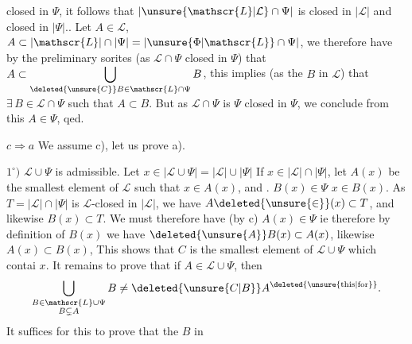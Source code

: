 closed in $\Psi$, it follows that $\lvert\unsure{\mathscr{L}|\mathcal{L}}\cap\Psi\rvert$ is closed in $\lvert\mathscr{L}\rvert$ and closed in $\lvert\Psi\rvert$.. Let $A\in\mathscr{L}$, $A\subset\lvert\mathscr{L}\rvert\cap\lvert\Psi\rvert=\lvert\unsure{\Phi|\mathscr{L}}\cap\Psi\rvert$, we therefore have by the preliminary sorites (as $\mathscr{L}\cap\Psi$ closed in $\Psi$) that $A\subset\displaystyle\bigcup_{\deleted{\unsure{C}}B\in\mathscr{L}\cap\Psi}B$, this implies  (as the $B$ in $\mathscr{L}$) that $\exists\,B\in\mathscr{L}\cap\Psi$ such that $A\subset B$.
 But as $\mathscr{L}\cap\Psi$ is $\Psi$ closed in $\Psi$, we conclude from this $A\in\Psi$, qed.

$c\Longrightarrow a$ \quad We assume c), let us prove a).

$1^\circ)$ $\mathscr{L}\cup\Psi$ is admissible. Let $x\in\lvert\mathscr{L}\cup\Psi\rvert=\lvert\mathscr{L}\rvert\cup\lvert\Psi\rvert$  If $x\in\lvert\mathscr{L}\rvert\cap\lvert\Psi\rvert$, let $A(x)$ be the smallest element of $\mathscr{L}$ such that $x\in A(x)$, and . $B(x)\in\Psi$  $x\in B(x)$. As $T=\lvert\mathscr{L}\rvert\cap\lvert\Psi\rvert$ is $\mathscr{L}$-closed in $\lvert\mathscr{L}\rvert$, we have $A\deleted{\unsure{\in}}(x)\subset T$, and likewise $B(x)\subset T$. We must therefore have (by c) $A(x)\in\Psi$ ie  therefore by definition of $B(x)$ we have $\deleted{\unsure{A}}B(x)\subset A(x)$, likewise $A(x)\subset B(x)$, 
  This shows that $C$ is the smallest element of $\mathscr{L}\cup\Psi$ which contai $x$. It remains to prove that if $A\in\mathscr{L}\cup\Psi$, then  \[
 \bigcup_{\substack{B\in\mathscr{L}\cup\Psi\\B\subsetneq A}}B
 \ne\deleted{\unsure{C|B}}A^{\text{\deleted{\unsure{this|for}}}} .
\]  It  suffices for this to prove that  the $B$ in
